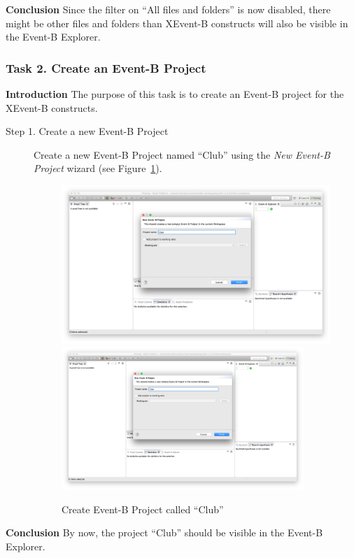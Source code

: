 \textbf{Conclusion} Since the filter on ``All files and folders'' is now disabled, there might be other files and folders than XEvent-B constructs will also be visible in the Event-B Explorer.

\subsubsection{Task 2. Create an Event-B Project}\label{CreateProject}
\textbf{Introduction} The purpose of this task is to create an Event-B project for the XEvent-B constructs. 
\begin{description}
\item[Step 1. Create a new Event-B Project] Create a new Event-B Project named ``Club'' using the \emph{New Event-B Project} wizard (see Figure~\ref{fig:CreateProject}).
\begin{figure}[!htbp]
  \centering
  \ifplastex
  \includegraphics[width=512]{figures/CreateProject}
  \else
  \includegraphics[width=0.9\textwidth]{figures/CreateProject}
  \fi
  \caption{Create Event-B Project called ``Club''}
  \label{fig:CreateProject}
\end{figure}

\end{description}
\textbf{Conclusion} By now, the project ``Club'' should be visible in the Event-B Explorer.


